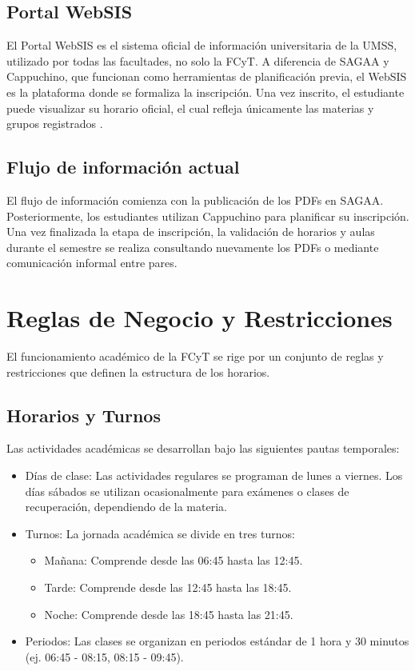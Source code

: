 \subsection{Portal WebSIS}

El Portal WebSIS es el sistema oficial de información universitaria de la UMSS, utilizado por todas las facultades, no solo la FCyT. A diferencia de SAGAA y Cappuchino, que funcionan como herramientas de planificación previa, el WebSIS es la plataforma donde se formaliza la inscripción. Una vez inscrito, el estudiante puede visualizar su horario oficial, el cual refleja únicamente las materias y grupos registrados \cite{websis_horario}.

\subsection{Flujo de información actual}

El flujo de información comienza con la publicación de los PDFs en SAGAA. Posteriormente, los estudiantes utilizan Cappuchino para planificar su inscripción. Una vez finalizada la etapa de inscripción, la validación de horarios y aulas durante el semestre se realiza consultando nuevamente los PDFs o mediante comunicación informal entre pares.

\section{Reglas de Negocio y Restricciones}

El funcionamiento académico de la FCyT se rige por un conjunto de reglas y restricciones que definen la estructura de los horarios.

\subsection{Horarios y Turnos}

Las actividades académicas se desarrollan bajo las siguientes pautas temporales:

\begin{itemize}
    \item Días de clase: Las actividades regulares se programan de lunes a viernes. Los días sábados se utilizan ocasionalmente para exámenes o clases de recuperación, dependiendo de la materia.
    \item Turnos: La jornada académica se divide en tres turnos:
    \begin{itemize}
        \item Mañana: Comprende desde las 06:45 hasta las 12:45.
        \item Tarde: Comprende desde las 12:45 hasta las 18:45.
        \item Noche: Comprende desde las 18:45 hasta las 21:45.
    \end{itemize}
    \item Periodos: Las clases se organizan en periodos estándar de 1 hora y 30 minutos (ej. 06:45 - 08:15, 08:15 - 09:45).
\end{itemize}

